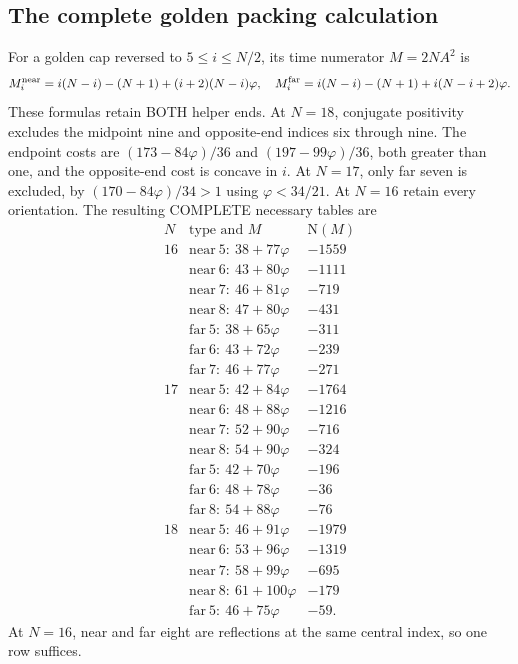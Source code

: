 \documentclass[11pt]{article}
\begin{document}
\subsection{The complete golden packing calculation}
\label{app:arithgoldenpacking}

For a golden cap reversed to \(5\le i\le N/2\), its time
numerator \(M=2NA^2\) is
\[
 M_i^{\rm near}=i(N-i)-(N+1)+(i+2)(N-i)\varphi,\quad
 M_i^{\rm far}=i(N-i)-(N+1)+i(N-i+2)\varphi .
\]
These formulas retain BOTH helper ends.
At \(N=18\), conjugate positivity excludes the midpoint nine
and opposite-end indices six through nine.
The endpoint costs are \((173-84\varphi)/36\) and
\((197-99\varphi)/36\), both greater than one, and the
opposite-end cost is concave in \(i\).
At \(N=17\), only far seven is excluded, by
\((170-84\varphi)/34>1\) using \(\varphi<34/21\).
At \(N=16\) retain every orientation.
The resulting COMPLETE necessary tables are
\[
\begin{array}{c|c|r}
 N&\text{type and }M&\mathrm N(M)\\ \hline
16&\mathrm{near}\ 5:\ 38+77\varphi&-1559\\
 &\mathrm{near}\ 6:\ 43+80\varphi&-1111\\
 &\mathrm{near}\ 7:\ 46+81\varphi&-719\\
 &\mathrm{near}\ 8:\ 47+80\varphi&-431\\
 &\mathrm{far}\ 5:\ 38+65\varphi&-311\\
 &\mathrm{far}\ 6:\ 43+72\varphi&-239\\
 &\mathrm{far}\ 7:\ 46+77\varphi&-271\\ \hline
17&\mathrm{near}\ 5:\ 42+84\varphi&-1764\\
 &\mathrm{near}\ 6:\ 48+88\varphi&-1216\\
 &\mathrm{near}\ 7:\ 52+90\varphi&-716\\
 &\mathrm{near}\ 8:\ 54+90\varphi&-324\\
 &\mathrm{far}\ 5:\ 42+70\varphi&-196\\
 &\mathrm{far}\ 6:\ 48+78\varphi&-36\\
 &\mathrm{far}\ 8:\ 54+88\varphi&-76\\ \hline
18&\mathrm{near}\ 5:\ 46+91\varphi&-1979\\
 &\mathrm{near}\ 6:\ 53+96\varphi&-1319\\
 &\mathrm{near}\ 7:\ 58+99\varphi&-695\\
 &\mathrm{near}\ 8:\ 61+100\varphi&-179\\
 &\mathrm{far}\ 5:\ 46+75\varphi&-59 .
\end{array}
\]
At \(N=16\), near and far eight are reflections at the same
central index, so one row suffices.
\end{document}
